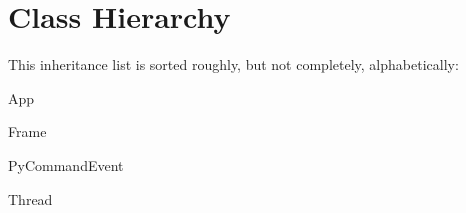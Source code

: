 \section{Class Hierarchy}
This inheritance list is sorted roughly, but not completely, alphabetically\-:\begin{DoxyCompactList}
\item App\begin{DoxyCompactList}
\item {}
\end{DoxyCompactList}
\item Frame\begin{DoxyCompactList}
\item {}
\end{DoxyCompactList}
\item Py\-Command\-Event\begin{DoxyCompactList}
\item {}
\end{DoxyCompactList}
\item {}
\item Thread\begin{DoxyCompactList}
\item {}
\end{DoxyCompactList}
\end{DoxyCompactList}
